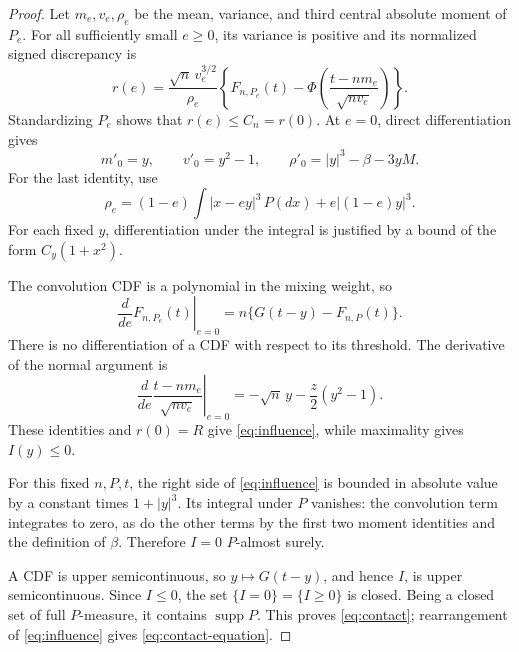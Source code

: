 \documentclass[aop]{imsart}
\theoremstyle{plain}
\theoremstyle{definition}
\theoremstyle{definition}
\DeclareMathOperator{\supp}{supp}
\begin{document}
\begin{proof}
Let \(m_e,v_e,\rho_e\) be the mean, variance, and third central absolute
moment of \(P_e\). For all sufficiently small \(e\ge0\), its variance is
positive and its normalized signed discrepancy is
\[
r(e)=\frac{\sqrt n\,v_e^{3/2}}{\rho_e}
\left\{F_{n,P_e}(t)-
\Phi\left(\frac{t-nm_e}{\sqrt{nv_e}}\right)\right\}.
\]
Standardizing \(P_e\) shows that \(r(e)\le C_n=r(0)\). At \(e=0\),
direct differentiation gives
\[
m'_0=y,\qquad v'_0=y^2-1,\qquad
\rho'_0=|y|^3-\beta-3yM.
\]
For the last identity, use
\[
\rho_e=(1-e)\int|x-ey|^3\,P(dx)+e|(1-e)y|^3.
\]
For each fixed \(y\), differentiation under the integral is justified
by a bound of the form \(C_y(1+x^2)\).

The convolution CDF is a polynomial in the mixing weight, so
\[
\left.\frac{d}{de}F_{n,P_e}(t)\right|_{e=0}
=n\{G(t-y)-F_{n,P}(t)\}.
\]
There is no differentiation of a CDF with respect to its threshold.
The derivative of the normal argument is
\[
\left.\frac{d}{de}\frac{t-nm_e}{\sqrt{nv_e}}\right|_{e=0}
=-\sqrt n\,y-\frac z2(y^2-1).
\]
These identities and \(r(0)=R\) give \eqref{eq:influence}, while maximality
gives \(I(y)\le0\).

For this fixed \(n,P,t\), the right side of \eqref{eq:influence} is
bounded in absolute value by a constant times \(1+|y|^3\). Its integral
under \(P\) vanishes: the convolution term integrates to zero, as do
the other terms by the first two moment identities and the definition
of \(\beta\). Therefore \(I=0\) \(P\)-almost surely.

A CDF is upper semicontinuous, so \(y\mapsto G(t-y)\), and hence \(I\),
is upper semicontinuous. Since \(I\le0\), the set \(\{I=0\}=\{I\ge0\}\)
is closed. Being a closed set of full \(P\)-measure, it contains
\(\supp P\). This proves \eqref{eq:contact}; rearrangement of
\eqref{eq:influence} gives \eqref{eq:contact-equation}.
\end{proof}
\end{document}
